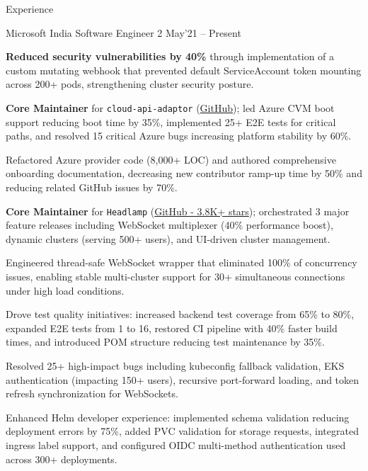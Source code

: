 \documentclass{resume} %
\begin{document}
\begin{rSection}{Experience}
\vspace{0.05cm}

  \begin{rWorkSection}{Microsoft}
                     {India}
                     {Software Engineer 2}
                     {May'21 -- Present} {
    \item \textbf{Reduced security vulnerabilities by 40\%} through implementation of a custom mutating webhook that prevented default ServiceAccount token mounting across 200+ pods, strengthening cluster security posture.
    \item \textbf{Core Maintainer} for \texttt{cloud-api-adaptor} (\href{https://github.com/confidential-containers/cloud-api-adaptor}{GitHub}); led Azure CVM boot support reducing boot time by 35\%, implemented 25+ E2E tests for critical paths, and resolved 15 critical Azure bugs increasing platform stability by 60\%.
    \item Refactored Azure provider code (8,000+ LOC) and authored comprehensive onboarding documentation, decreasing new contributor ramp-up time by 50\% and reducing related GitHub issues by 70\%.
    \item \textbf{Core Maintainer} for \texttt{Headlamp} (\href{https://github.com/kubernetes-sigs/headlamp}{GitHub - 3.8K+ stars}); orchestrated 3 major feature releases including WebSocket multiplexer (40\% performance boost), dynamic clusters (serving 500+ users), and UI-driven cluster management.
    \item Engineered thread-safe WebSocket wrapper that eliminated 100\% of concurrency issues, enabling stable multi-cluster support for 30+ simultaneous connections under high load conditions.
    \item Drove test quality initiatives: increased backend test coverage from 65\% to 80\%, expanded E2E tests from 1 to 16, restored CI pipeline with 40\% faster build times, and introduced POM structure reducing test maintenance by 35\%.
    \item Resolved 25+ high-impact bugs including kubeconfig fallback validation, EKS authentication (impacting 150+ users), recursive port-forward loading, and token refresh synchronization for WebSockets.
    \item Enhanced Helm developer experience: implemented schema validation reducing deployment errors by 75\%, added PVC validation for storage requests, integrated ingress label support, and configured OIDC multi-method authentication used across 300+ deployments.
}
\end{rWorkSection}
\end{rSection}
\end{document}
